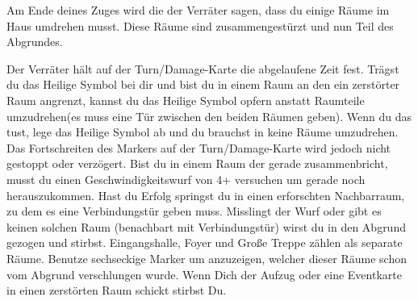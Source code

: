 Am Ende deines Zuges wird die der Verräter sagen, dass du einige Räume im Haus umdrehen musst. Diese Räume sind zusammengestürzt und nun Teil des Abgrundes.


    \begin{itemize}
        \bitem  Der Verräter hält auf der Turn/Damage-Karte die abgelaufene Zeit fest.
        \bitem Trägst du das Heilige Symbol bei dir und bist du in einem Raum an den ein zerstörter Raum angrenzt, kannst du das Heilige Symbol opfern anstatt Raumteile umzudrehen(es muss eine Tür zwischen den beiden Räumen geben). Wenn du das tust, lege das Heilige Symbol ab und du brauchst in keine Räume umzudrehen. Das Fortschreiten des Markers auf der Turn/Damage-Karte wird jedoch nicht gestoppt oder verzögert.
        \bitem Bist du in einem Raum der gerade zusammenbricht, musst du einen Geschwindigkeitswurf von 4+ versuchen um gerade noch herauszukommen. Hast du Erfolg springst du in einen erforschten Nachbarraum, zu dem es eine Verbindungstür geben muss. Misslingt der Wurf oder gibt es keinen solchen Raum (benachbart mit Verbindungstür) wirst du in den Abgrund gezogen und stirbst.
        \bitem Eingangshalle, Foyer und Große Treppe zählen als separate Räume. Benutze sechseckige Marker um anzuzeigen, welcher dieser Räume schon vom Abgrund verschlungen wurde.
        \bitem Wenn Dich der Aufzug oder eine Eventkarte in einen zerstörten Raum schickt stirbst Du.
    \end{itemize}


